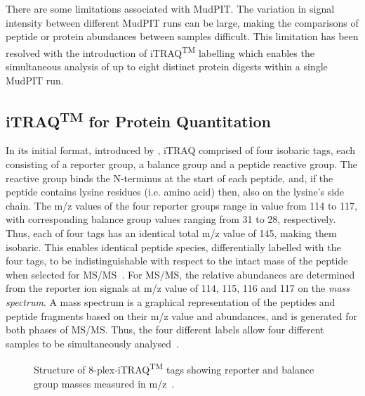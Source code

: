 \documentclass[11pt,a4paper]{article}
\begin{document}
There are some limitations associated with MudPIT. The variation in signal intensity between different MudPIT runs can be large, making the comparisons of peptide or protein abundances between samples difficult. This limitation has been resolved with the introduction of iTRAQ\textsuperscript{TM} labelling which enables the simultaneous analysis of up to eight distinct protein digests within a single MudPIT run.

\subsection{iTRAQ\textsuperscript{TM} for Protein Quantitation}\label{subsec:iTRAQ}
In its initial format, introduced by \cite{Ross2004}, iTRAQ comprised of four isobaric tags, each consisting of a reporter group, a balance group and a peptide reactive group. The reactive group binds the N-terminus at the start of each peptide, and, if the peptide contains lysine residues (i.e. amino acid) then, also on the lysine's side chain. The m/z values of the four reporter groups range in value from 114 to 117, with corresponding balance group values ranging from 31 to 28, respectively. Thus, each of four tags has an identical total m/z value of 145, making them isobaric. This enables identical peptide species, differentially labelled with the four tags, to be indistinguishable with respect to the intact mass of the peptide when selected for MS/MS~\citep{Ross2004}. For MS/MS, the relative abundances are determined from the reporter ion signals at m/z value of 114, 115, 116 and 117 on the \emph{mass spectrum}. A mass spectrum is a graphical representation of the peptides and peptide fragments based on their m/z value and abundances, and is generated for both phases of MS/MS. Thus, the four different labels allow four different samples to be simultaneously analysed~\citep{Ross2004}.
  
\begin{figure}[htb]
\caption{Structure of 8-plex-iTRAQ\textsuperscript{TM} tags showing reporter and balance group masses measured in m/z~\citep{Choe2007}.}
\label{fig:8-plex}
\end{figure}
\end{document}
